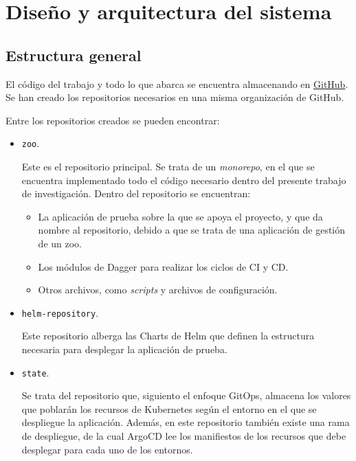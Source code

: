\chapter{Diseño y arquitectura del sistema}

\section{Estructura general}

El código del trabajo y todo lo que abarca se encuentra almacenando en \href{https://github.com/orgs/vieites-tfg/repositories?type=source}{GitHub}. Se han creado los repositorios necesarios en una misma organización de GitHub.

Entre los repositorios creados se pueden encontrar:

\begin{itemize}
  \item \texttt{zoo}.

    Este es el repositorio principal. Se trata de un \textit{monorepo}, en el que se encuentra implementado todo el código necesario dentro del presente trabajo de investigación. Dentro del repositorio se encuentran:
    \begin{itemize}
      \item La aplicación de prueba sobre la que se apoya el proyecto, y que da nombre al repositorio, debido a que se trata de una aplicación de gestión de un zoo.
      \item Los módulos de Dagger para realizar los ciclos de CI y CD.
      \item Otros archivos, como \textit{scripts} y archivos de configuración.
    \end{itemize}

  \item \texttt{helm-repository}.

    Este repositorio alberga las Charts de Helm que definen la estructura necesaria para desplegar la aplicación de prueba.

  \item \texttt{state}.

    Se trata del repositorio que, siguiento el enfoque GitOps, almacena los valores que poblarán los recursos de Kubernetes según el entorno en el que se despliegue la aplicación. Además, en este repositorio también existe una rama de despliegue, de la cual ArgoCD lee los manifiestos de los recursos que debe desplegar para cada uno de los entornos.
\end{itemize}

